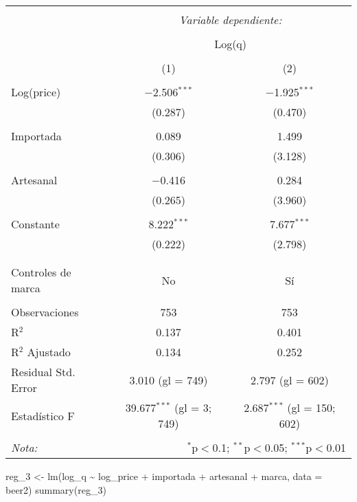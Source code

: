 \documentclass[
]{article}
\newenvironment{Shaded}{\begin{snugshade}}{\end{snugshade}}
\newcommand{\AttributeTok}[1]{\textcolor[rgb]{0.77,0.63,0.00}{#1}}
\newcommand{\FunctionTok}[1]{\textcolor[rgb]{0.00,0.00,0.00}{#1}}
\newcommand{\NormalTok}[1]{#1}
\newcommand{\OtherTok}[1]{\textcolor[rgb]{0.56,0.35,0.01}{#1}}
\newcommand{\SpecialCharTok}[1]{\textcolor[rgb]{0.00,0.00,0.00}{#1}}
\begin{document}
\begin{table}[!htbp] \centering 
  \caption{} 
  \label{} 
\begin{tabular}{@{\extracolsep{5pt}}lcc} 
\\[-1.8ex]\hline 
\hline \\[-1.8ex] 
 & \multicolumn{2}{c}{\textit{Variable dependiente:}} \\ 
\cline{2-3} 
\\[-1.8ex] & \multicolumn{2}{c}{Log(q)} \\ 
\\[-1.8ex] & (1) & (2)\\ 
\hline \\[-1.8ex] 
 Log(price) & $-$2.506$^{***}$ & $-$1.925$^{***}$ \\ 
  & (0.287) & (0.470) \\ 
  & & \\ 
 Importada & 0.089 & 1.499 \\ 
  & (0.306) & (3.128) \\ 
  & & \\ 
 Artesanal & $-$0.416 & 0.284 \\ 
  & (0.265) & (3.960) \\ 
  & & \\ 
 Constante & 8.222$^{***}$ & 7.677$^{***}$ \\ 
  & (0.222) & (2.798) \\ 
  & & \\ 
\hline \\ [-1.8ex]
Controles de marca &  No &  Sí  \\

\hline \\
[-1.8ex] 
Observaciones & 753 & 753 \\ 
R$^{2}$ & 0.137 & 0.401 \\ 
R$^{2}$ Ajustado & 0.134 & 0.252 \\ 
Residual Std. Error & 3.010 (gl = 749) & 2.797 (gl = 602) \\ 
Estadístico F & 39.677$^{***}$ (gl = 3; 749) & 2.687$^{***}$ (gl = 150; 602) \\ 
\hline 
\hline \\[-1.8ex] 
\textit{Nota:}  & \multicolumn{2}{r}{$^{*}$p$<$0.1; $^{**}$p$<$0.05; $^{***}$p$<$0.01} \\ 
\end{tabular} 
\end{table}

\begin{Shaded}
\begin{Highlighting}[]
\NormalTok{reg\_3 }\OtherTok{\textless{}{-}} \FunctionTok{lm}\NormalTok{(log\_q }\SpecialCharTok{\textasciitilde{}}\NormalTok{ log\_price }\SpecialCharTok{+}\NormalTok{ importada }\SpecialCharTok{+}\NormalTok{ artesanal }\SpecialCharTok{+}\NormalTok{ marca, }\AttributeTok{data =}\NormalTok{ beer2)}
\FunctionTok{summary}\NormalTok{(reg\_3)}
\end{Highlighting}
\end{Shaded}
\end{document}

